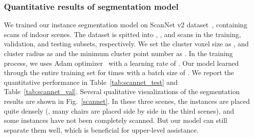 \documentclass[10pt,twocolumn,letterpaper]{article}
\begin{document}
\subsubsection{Quantitative results of segmentation model}

We trained our instance segmentation model on ScanNet v2 dataset~\cite{scannet}, containing  scans of indoor scenes. The dataset is spitted into , , and  scans in the training, validation, and testing subsets, respectively. We set the cluster voxel size as , and cluster radius as  and the minimum cluster point number as . In the training process, we uses Adam optimizer~\cite{adam_optimization} with a learning rate of . Our model learned through the entire training set for  times with a batch size of . We report the quantitative performance in Table~\ref{tab:scannet_test} and Table~\ref{tab:scannet_val}. Several qualitative visualizations of the segmentation results are shown in Fig.~\ref{scannet}. In these three scenes, the instances are placed quite densely (\eg, many chairs are placed side by side in the third scenes), and some instances have not been completely scanned. But our model can still separate them well, which is beneficial for upper-level assistance.
\end{document}

